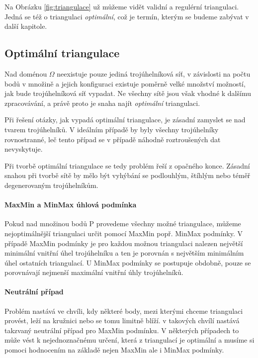 \documentclass[12pt,a4paper]{article}
\begin{document}
Na Obrázku \ref{fig:triangulace} už můžeme vidět validní a regulérní triangulaci. Jedná se též o triangulaci \textit{optimální}, což je termín, kterým se budeme zabývat v další kapitole.

\newpage
\subsection{Optimální triangulace}

Nad doménou $\Omega$ neexistuje pouze jediná trojúhelníková síť, v závislosti na počtu bodů v množině a jejich konfiguraci existuje poměrně velké množství možností, jak bude trojúhelníková síť vypadat. Ne všechny sítě jsou však vhodné k dalšímu zpracovávání, a právě proto je snaha najít \textit{optimální} triangulaci.

Při řešení otázky, jak vypadá optimální triangulace, je zásadní zamyslet se nad tvarem trojúhelníků. V ideálním případě by byly všechny trojúhelníky rovnostranné, leč tento případ se v případě náhodně roztroušených dat nevyskytuje.

Při tvorbě optimální triangulace se tedy problém řeší z opačného konce. Zásadní snahou při tvorbě sítě by mělo být vyhýbání se podlouhlým, štíhlým nebo téměř degenerovaným trojúhelníkům. 

\paragraph{MaxMin a MinMax úhlová podmínka}

Pokud nad množinou bodů P provedeme všechny možné triangulace, můžeme nejoptimálnější triangulaci určit pomocí MaxMin popř. MinMax podmínky. V případě MaxMin podmínky je pro každou možnou triangulaci nalezen největší minimální vnitřní úhel trojúhelníku a ten je porovnán s největším minimálním úhel ostatních triangulací. U MinMax podmínky se postupuje obdobně, pouze se porovnávají nejmenší maximální vnitřní úhly trojúhelníků.

\paragraph{Neutrální případ}

Problém nastává ve chvíli, kdy některé body, mezi kterými chceme triangulaci provést, leží na kružnici nebo se tomu limitně blíží. v takových chvílí nastává takzvaný neutrální případ pro MaxMin podmínku. V některých případech to může vést k nejednoznačnému určení, která z triangulací je optimální a musíme si pomoci hodnocením na základě nejen MaxMin ale i MinMax podmínky.
\end{document}
